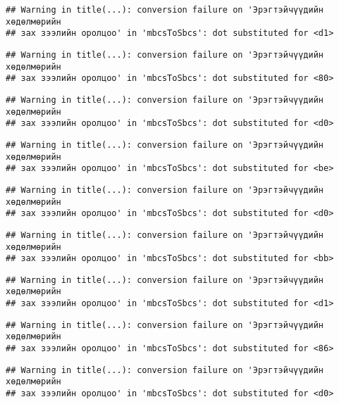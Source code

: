 \documentclass[]{article}
\begin{document}
\begin{verbatim}
## Warning in title(...): conversion failure on 'Эрэгтэйчүүдийн хөдөлмөрийн
## зах зээлийн оролцоо' in 'mbcsToSbcs': dot substituted for <d1>
\end{verbatim}

\begin{verbatim}
## Warning in title(...): conversion failure on 'Эрэгтэйчүүдийн хөдөлмөрийн
## зах зээлийн оролцоо' in 'mbcsToSbcs': dot substituted for <80>
\end{verbatim}

\begin{verbatim}
## Warning in title(...): conversion failure on 'Эрэгтэйчүүдийн хөдөлмөрийн
## зах зээлийн оролцоо' in 'mbcsToSbcs': dot substituted for <d0>
\end{verbatim}

\begin{verbatim}
## Warning in title(...): conversion failure on 'Эрэгтэйчүүдийн хөдөлмөрийн
## зах зээлийн оролцоо' in 'mbcsToSbcs': dot substituted for <be>
\end{verbatim}

\begin{verbatim}
## Warning in title(...): conversion failure on 'Эрэгтэйчүүдийн хөдөлмөрийн
## зах зээлийн оролцоо' in 'mbcsToSbcs': dot substituted for <d0>
\end{verbatim}

\begin{verbatim}
## Warning in title(...): conversion failure on 'Эрэгтэйчүүдийн хөдөлмөрийн
## зах зээлийн оролцоо' in 'mbcsToSbcs': dot substituted for <bb>
\end{verbatim}

\begin{verbatim}
## Warning in title(...): conversion failure on 'Эрэгтэйчүүдийн хөдөлмөрийн
## зах зээлийн оролцоо' in 'mbcsToSbcs': dot substituted for <d1>
\end{verbatim}

\begin{verbatim}
## Warning in title(...): conversion failure on 'Эрэгтэйчүүдийн хөдөлмөрийн
## зах зээлийн оролцоо' in 'mbcsToSbcs': dot substituted for <86>
\end{verbatim}

\begin{verbatim}
## Warning in title(...): conversion failure on 'Эрэгтэйчүүдийн хөдөлмөрийн
## зах зээлийн оролцоо' in 'mbcsToSbcs': dot substituted for <d0>
\end{verbatim}
\end{document}
